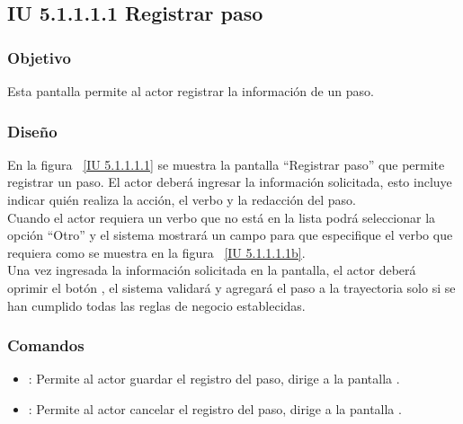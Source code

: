 \subsection{IU 5.1.1.1.1 Registrar paso}

\subsubsection{Objetivo}
	
	Esta pantalla permite al actor registrar la información de un paso.

\subsubsection{Diseño}

    En la figura ~\ref{IU 5.1.1.1.1} se muestra la pantalla ``Registrar paso'' que permite registrar un paso. El actor deberá ingresar la información solicitada, 
    esto incluye indicar quién realiza la acción, el verbo y la redacción del paso.\\
    
    Cuando el actor requiera un verbo que no está en la lista podrá seleccionar la opción ``Otro'' y el sistema mostrará un campo para 
    que especifique el verbo que requiera como se muestra en la figura ~\ref{IU 5.1.1.1.1b}. \\
    
    
    Una vez ingresada la información solicitada en la pantalla, el actor deberá oprimir el botón 
    , el sistema validará y agregará el paso a la trayectoria solo si se han cumplido todas las reglas de negocio establecidas.  \\




\subsubsection{Comandos}
\begin{itemize}
	\item {}: Permite al actor guardar el registro del paso, dirige a la pantalla .
	\item {}: Permite al actor cancelar el registro del paso, dirige a la pantalla .
\end{itemize}

